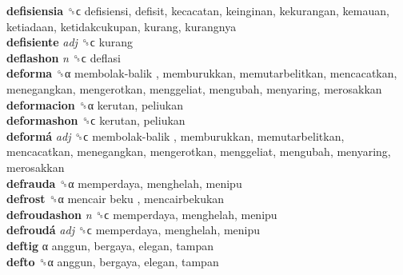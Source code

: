 \textbf{defisiensia} ␝ϲ  defisiensi, defisit, kecacatan, keinginan, kekurangan, kemauan, ketiadaan, ketidakcukupan, kurang, kurangnya  \\
\textbf{defisiente} \emph{adj}  ␝ϲ  kurang  \\
\textbf{deflashon} \emph{n}  ␝ϲ  deflasi  \\
\textbf{deforma} ␝α   membolak-balik , memburukkan, memutarbelitkan, mencacatkan, menegangkan, mengerotkan, menggeliat, mengubah, menyaring, merosakkan  \\
\textbf{deformacion} ␝α  kerutan, peliukan  \\
\textbf{deformashon} ␝ϲ  kerutan, peliukan  \\
\textbf{deformá} \emph{adj}  ␝ϲ   membolak-balik , memburukkan, memutarbelitkan, mencacatkan, menegangkan, mengerotkan, menggeliat, mengubah, menyaring, merosakkan  \\
\textbf{defrauda} ␝α  memperdaya, menghelah, menipu  \\
\textbf{defrost} ␝α   mencair beku , mencairbekukan  \\
\textbf{defroudashon} \emph{n}  ␝ϲ  memperdaya, menghelah, menipu  \\
\textbf{defroudá} \emph{adj}  ␝ϲ  memperdaya, menghelah, menipu  \\
\textbf{deftig} α  anggun, bergaya, elegan, tampan  \\
\textbf{defto} ␝α  anggun, bergaya, elegan, tampan  \\
